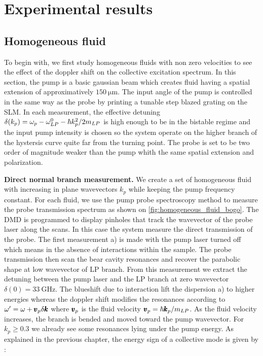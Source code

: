 \section{Experimental results}

\subsection{Homogeneous fluid}

To begin with, we first study homogeneous fluids with non zero velocities to see the effect of the doppler shift on the collective excitation spectrum. In this section,
the pump is a basic gaussian beam which creates fluid having a spatial extension of approximatively $150 \ \mathrm{\mu m}$. The input angle of the pump
is controlled in the same way as the probe by printing a tunable step blazed grating on the SLM. In each measurement, the effective detuning 
$\delta(k_p)=\omega_p -\omega_{LP}^0- \hbar k_p^2/2m_{LP}$ is high enough to be in the bistable regime and the input pump intensity is chosen so the system operate on the higher branch of the hystersis curve quite far from the turning point. 
The probe is set to be two order of magnitude weaker than the pump whith the same spatial extension and polarization.

\bigskip

\textbf{Direct normal branch measurement.} We create a set of homogeneous fluid with increasing in plane wavevectors $k_p$ while keeping the pump frequency constant. 
For each fluid, we use the pump probe spectroscopy method to measure the probe transmission spectrum as shown on \autoref{fig:homogeneous_fluid_bogo}. 
The DMD is programmed to display pinholes that track the wavevector of the probe laser along the scans. In this case the system measure the direct transmission of the probe. The first measurement a) is made with the pump laser turned off which means in the absence of interactions within the sample.
The probe transmission then scan the bear cavity resonances and recover the parabolic shape at low wavevector of LP branch. From this measurement we extract the detuning between the pump laser and the LP branch at zero wavevector
 $\delta(0) = \SI{33}{\giga\hertz}$. 
 The blueshift due to interaction lift the dispersion a) to higher energies whereas the doppler shift modifies the resonances according to 
 $\omega' = \omega + \pmb{v}_p\delta \pmb{k}$ where $\pmb{v}_p$ is the fluid velocity $\pmb{v}_p = \hbar \pmb{k}_p/m_{LP}$.  As the fluid velocity increases, the branch is bended and moved toward the pump wavevector. 
 For $k_p\geq 0.3$ we already see some resonances lying under the pump energy. As explained in the previous chapter, the energy sign of a collective mode is given by :
 
